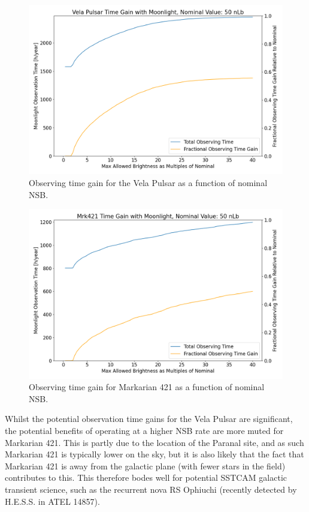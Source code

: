 \begin{figure}[h!]
\begin{centering}
\includegraphics[width=\columnwidth]{./figures/obstime_VelaPulsar_nom.png}
\caption{Observing time gain for the Vela Pulsar as a function of nominal NSB.}
\label{fig:obstimegainvelapulsar}
\end{centering}
\end{figure}

\begin{figure}[h!]
\begin{centering}
\includegraphics[width=\columnwidth]{./figures/obstime_mrk421_nom.png}
\caption{Observing time gain for Markarian 421 as a function of nominal NSB.}
\label{fig:obstimegainmrk421}
\end{centering}
\end{figure}

Whilst the potential observation time gains for the Vela Pulsar are significant, the potential benefits of operating at a higher NSB rate are more muted for Markarian 421. This is partly due to the location of the Paranal site, and as such Markarian 421 is typically lower on the sky, but it is also likely that the fact that Markarian 421 is away from the galactic plane (with fewer stars in the field) contributes to this. This therefore bodes well for potential SSTCAM galactic transient science, such as the recurrent nova RS Ophiuchi (recently detected by H.E.S.S. in ATEL 14857).


